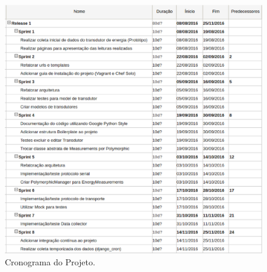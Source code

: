 \begin{figure}[!htpb]
    \centering
    \includegraphics[keepaspectratio=true,scale=0.5]{figuras/cronograma.eps}
    \caption{Cronograma do Projeto.}
    \label{cronograma}
\end{figure}